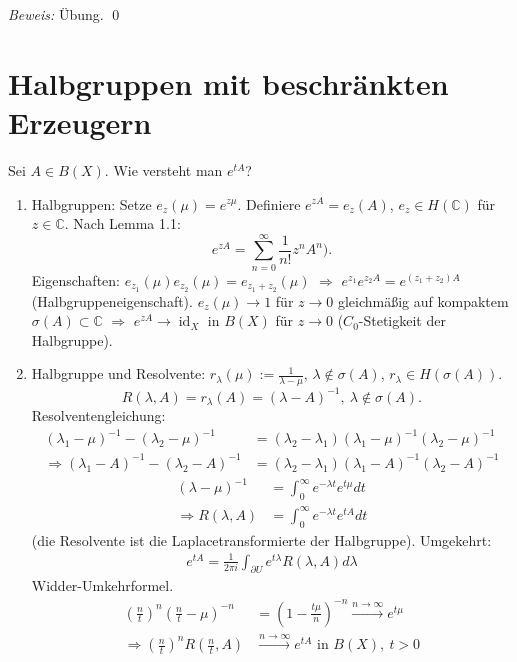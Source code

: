 \documentclass[12pt]{extreport} %
\DeclareMathOperator{\id}{id}
\numberwithin{equation}{section}
\newcommand{\C}{\mathbb{C}} %
\newcommand{\Bew}{\emph{Beweis: }}
\begin{document}
	\Bew Übung.
	\qed
	
	\section{Halbgruppen mit beschränkten Erzeugern}
	
	Sei $A\in B(X)$. Wie versteht man \glqq $e^{tA}$\grqq?
	\begin{enumerate}
		\item Halbgruppen: Setze $e_z(\mu) = e^{z\mu}$. Definiere $e^{zA} = e_z(A)$, $e_z\in H(\C)$ für $z\in \C$. Nach Lemma 1.1: 
		$$e^{zA} = \sum_{n = 0}^{\infty} \frac{1}{n!} z^n A^n).$$
		Eigenschaften: $e_{z_1}(\mu) e_{z_2}(\mu) = e_{z_1+z_2}(\mu)$ $\Rightarrow$ $e^{z_1} e^{z_2 A} = e^{(z_1+z_2) A}$ (Halbgruppeneigenschaft).
		$e_z(\mu)\rightarrow 1$ für $z\rightarrow 0$ gleichmäßig auf kompaktem $\sigma(A)\subset \C$ $\Rightarrow$ $e^{zA}\rightarrow \id_X$ in $B(X)$ für $z\rightarrow 0$ ($C_0$-Stetigkeit der Halbgruppe).
		\item Halbgruppe und Resolvente: $r_\lambda(\mu):=\frac{1}{\lambda-\mu}$, $\lambda \notin \sigma(A)$, $r_\lambda\in H(\sigma(A))$. 
		$$R(\lambda,A) = r_\lambda(A) = (\lambda - A)^{-1},~ \lambda\notin\sigma(A).$$
		Resolventengleichung:
		\begin{align*}
			(\lambda_1-\mu)^{-1} - (\lambda_2-\mu)^{-1} &= (\lambda_2-\lambda_1) (\lambda_1-\mu)^{-1} (\lambda_2-\mu)^{-1}\\
			\Rightarrow (\lambda_1-A)^{-1} - (\lambda_2-A)^{-1} &= (\lambda_2-\lambda_1) (\lambda_1-A)^{-1} (\lambda_2-A)^{-1}
		\end{align*}
		\begin{align*}
			(\lambda-\mu)^{-1} &= \int_{0}^{\infty} e^{-\lambda t} e^{t\mu} dt\\
			\Rightarrow R(\lambda, A) &= \int_{0}^{\infty} e^{-\lambda t} e^{tA} dt
		\end{align*}
		(die Resolvente ist die Laplacetransformierte der Halbgruppe). Umgekehrt:
		\begin{align*}
			e^{tA} = \frac{1}{2\pi i}\int_{\partial U}e^{t\lambda} R(\lambda, A)d\lambda
		\end{align*}
		Widder-Umkehrformel.
		\begin{align*}
			\left(\frac{n}{t} \right)^n \left(\frac{n}{t}-\mu \right)^{-n} &= \left(1-\frac{t\mu}{n} \right)^{-n} \overset{n\rightarrow \infty }{\longrightarrow} e^{t\mu}\\
			\Rightarrow \left(\frac{n}{t} \right)^n R\left(\frac{n}{t}, A\right) &\overset{n\rightarrow\infty}{\longrightarrow} e^{tA}\text{ in } B(X),~ t>0

\end{align*}
\end{enumerate}
\end{document}
